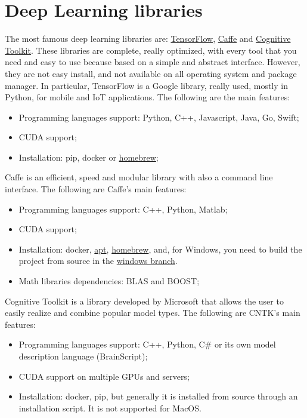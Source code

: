 \section{Deep Learning libraries}

The most famous deep learning libraries are: \href{https://www.tensorflow.org}{TensorFlow}, \href{http://caffe.berkeleyvision.org}{Caffe} and \href{https://docs.microsoft.com/it-it/cognitive-toolkit}{Cognitive Toolkit}. These libraries are complete, really optimized, with every tool that you need and easy to use because based on a simple and abstract interface. However, they are not easy install, and not available on all operating system and package manager. In particular, TensorFlow is a Google library, really used, mostly in Python, for mobile and IoT applications. The following are the main features:
\begin{itemize}
	\item Programming languages support: Python, C++, Javascript, Java, Go, Swift;
	\item CUDA support;
	\item Installation: pip, docker or \href{https://formulae.brew.sh/formula/libtensorflow}{homebrew};
\end{itemize}

Caffe is an efficient, speed and modular library with also a command line interface. The following are Caffe's main features: 
\begin{itemize}
	\item Programming languages support: C++, Python, Matlab; 
	\item CUDA support;
	\item Installation: docker, \href{http://caffe.berkeleyvision.org/install_apt.html}{apt}, \href{https://formulae.brew.sh/formula/caffe}{homebrew}, and, for Windows, you need to build the project from source in the \href{https://github.com/BVLC/caffe/tree/windows}{windows branch}.
	\item Math libraries dependencies: BLAS and BOOST;
\end{itemize}

Cognitive Toolkit is a library developed by Microsoft that allows the user to easily realize and combine popular model types. The following are CNTK's main features: 
\begin{itemize}
	\item Programming languages support: C++, Python, C\# or its own model description language (BrainScript); 
	\item CUDA support on multiple GPUs and servers;
	\item Installation: docker, pip, but generally it is installed from source through an installation script. It is not supported for MacOS.
\end{itemize}

